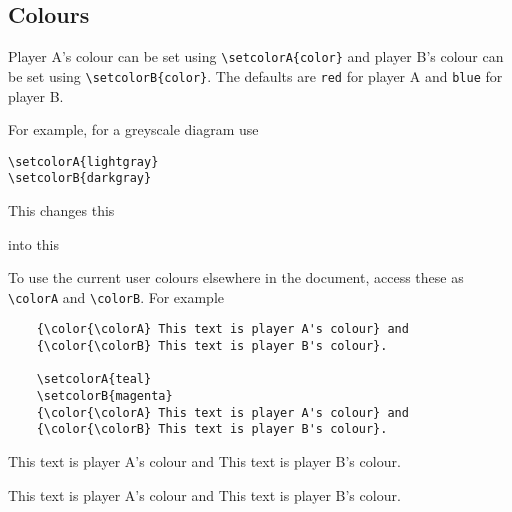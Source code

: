 \documentclass[a4paper,12pt]{article}
\begin{document}
    \subsection{Colours}
    
    Player A's colour can be set using \verb|\setcolorA{color}| and player B's colour can be set using \verb|\setcolorB{color}|. The defaults are \verb|red| for player A and \verb|blue| for player B.
    
    For example, for a greyscale diagram use
    
    \begin{verbatim}\setcolorA{lightgray}
\setcolorB{darkgray}\end{verbatim}
    
    This changes this\\
    
    \begin{hexpicture}
    \end{hexpicture}

    into this\\
    
    \begin{hexpicture}
    \end{hexpicture}
    
    To use the current user colours elsewhere in the document, access these as \verb|\colorA| and \verb|\colorB|. For example
    
    \begin{verbatim}
    {\color{\colorA} This text is player A's colour} and 
    {\color{\colorB} This text is player B's colour}.
    
    \setcolorA{teal}
    \setcolorB{magenta}
    {\color{\colorA} This text is player A's colour} and 
    {\color{\colorB} This text is player B's colour}.
    \end{verbatim}
    
    {\color{\colorA} This text is player A's colour} and 
    {\color{\colorB} This text is player B's colour}.
    
    {\color{\colorA} This text is player A's colour} and 
    {\color{\colorB} This text is player B's colour}.
    
\end{document}
